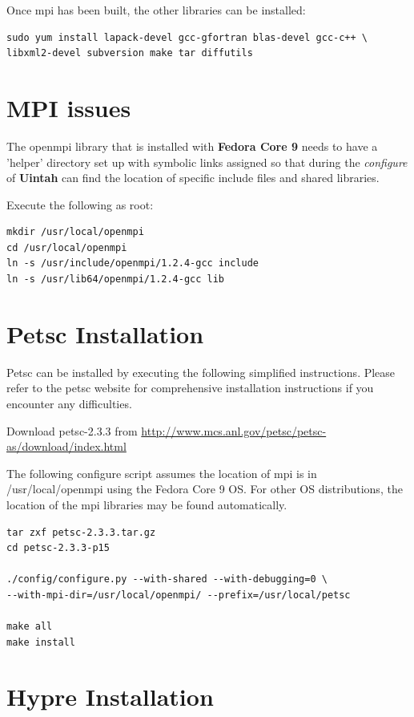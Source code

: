 \documentclass[12pt]{article}
\begin{document}
Once mpi has been built, the other libraries can be installed:
\begin{verbatim}
sudo yum install lapack-devel gcc-gfortran blas-devel gcc-c++ \
libxml2-devel subversion make tar diffutils
\end{verbatim}

\section{MPI issues} 
\label{sec:mpi}

The openmpi library that is installed with \textbf{Fedora Core 9}
needs to have a 'helper' directory set up with symbolic links assigned
so that during the \emph{configure} of \textbf{Uintah} can find the
location of specific include files and shared libraries.

Execute the following as root:

\begin{Verbatim}
mkdir /usr/local/openmpi
cd /usr/local/openmpi
ln -s /usr/include/openmpi/1.2.4-gcc include
ln -s /usr/lib64/openmpi/1.2.4-gcc lib
\end{Verbatim}



\section{Petsc Installation}

Petsc can be installed by executing the following simplified
instructions.  Please refer to the petsc website for comprehensive
installation instructions if you encounter any difficulties.

Download petsc-2.3.3 from
\url{http://www.mcs.anl.gov/petsc/petsc-as/download/index.html}

The following configure script assumes the location of mpi is in
/usr/local/openmpi using the Fedora Core 9 OS.  For other OS
distributions, the location of the mpi libraries may be found
automatically.

\begin{Verbatim}
tar zxf petsc-2.3.3.tar.gz
cd petsc-2.3.3-p15

./config/configure.py --with-shared --with-debugging=0 \ 
--with-mpi-dir=/usr/local/openmpi/ --prefix=/usr/local/petsc

make all
make install
\end{Verbatim}

\section{Hypre Installation}
\end{document}
